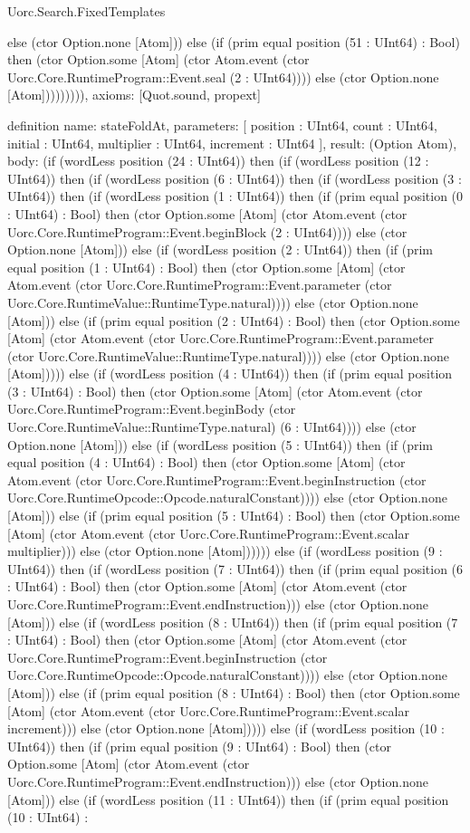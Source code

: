 \begin{lexlean}{Uorc.Search.FixedTemplates}
\begin{semanticmodule}
{else (ctor Option.none [Atom])) else (if (prim equal position (51 : UInt64) : Bool) then (ctor Option.some [Atom] (ctor Atom.event (ctor Uorc.Core.RuntimeProgram::Event.seal (2 : UInt64)))) else (ctor Option.none [Atom])))))))),
  axioms: [Quot.sound, propext]
}

definition{
  name: stateFoldAt,
  parameters: [
    position : UInt64,
    count : UInt64,
    initial : UInt64,
    multiplier : UInt64,
    increment : UInt64
  ],
  result: (Option Atom),
  body: (if (wordLess position (24 : UInt64)) then (if (wordLess position (12 : UInt64)) then (if (wordLess position (6 : UInt64)) then (if (wordLess position (3 : UInt64)) then (if (wordLess position (1 : UInt64)) then (if (prim equal position (0 : UInt64) : Bool) then (ctor Option.some [Atom] (ctor Atom.event (ctor Uorc.Core.RuntimeProgram::Event.beginBlock (2 : UInt64)))) else (ctor Option.none [Atom])) else (if (wordLess position (2 : UInt64)) then (if (prim equal position (1 : UInt64) : Bool) then (ctor Option.some [Atom] (ctor Atom.event (ctor Uorc.Core.RuntimeProgram::Event.parameter (ctor Uorc.Core.RuntimeValue::RuntimeType.natural)))) else (ctor Option.none [Atom])) else (if (prim equal position (2 : UInt64) : Bool) then (ctor Option.some [Atom] (ctor Atom.event (ctor Uorc.Core.RuntimeProgram::Event.parameter (ctor Uorc.Core.RuntimeValue::RuntimeType.natural)))) else (ctor Option.none [Atom])))) else (if (wordLess position (4 : UInt64)) then (if (prim equal position (3 : UInt64) : Bool) then (ctor Option.some [Atom] (ctor Atom.event (ctor Uorc.Core.RuntimeProgram::Event.beginBody (ctor Uorc.Core.RuntimeValue::RuntimeType.natural) (6 : UInt64)))) else (ctor Option.none [Atom])) else (if (wordLess position (5 : UInt64)) then (if (prim equal position (4 : UInt64) : Bool) then (ctor Option.some [Atom] (ctor Atom.event (ctor Uorc.Core.RuntimeProgram::Event.beginInstruction (ctor Uorc.Core.RuntimeOpcode::Opcode.naturalConstant)))) else (ctor Option.none [Atom])) else (if (prim equal position (5 : UInt64) : Bool) then (ctor Option.some [Atom] (ctor Atom.event (ctor Uorc.Core.RuntimeProgram::Event.scalar multiplier))) else (ctor Option.none [Atom]))))) else (if (wordLess position (9 : UInt64)) then (if (wordLess position (7 : UInt64)) then (if (prim equal position (6 : UInt64) : Bool) then (ctor Option.some [Atom] (ctor Atom.event (ctor Uorc.Core.RuntimeProgram::Event.endInstruction))) else (ctor Option.none [Atom])) else (if (wordLess position (8 : UInt64)) then (if (prim equal position (7 : UInt64) : Bool) then (ctor Option.some [Atom] (ctor Atom.event (ctor Uorc.Core.RuntimeProgram::Event.beginInstruction (ctor Uorc.Core.RuntimeOpcode::Opcode.naturalConstant)))) else (ctor Option.none [Atom])) else (if (prim equal position (8 : UInt64) : Bool) then (ctor Option.some [Atom] (ctor Atom.event (ctor Uorc.Core.RuntimeProgram::Event.scalar increment))) else (ctor Option.none [Atom])))) else (if (wordLess position (10 : UInt64)) then (if (prim equal position (9 : UInt64) : Bool) then (ctor Option.some [Atom] (ctor Atom.event (ctor Uorc.Core.RuntimeProgram::Event.endInstruction))) else (ctor Option.none [Atom])) else (if (wordLess position (11 : UInt64)) then (if (prim equal position (10 : UInt64) : }
\end{semanticmodule}
\end{lexlean}
